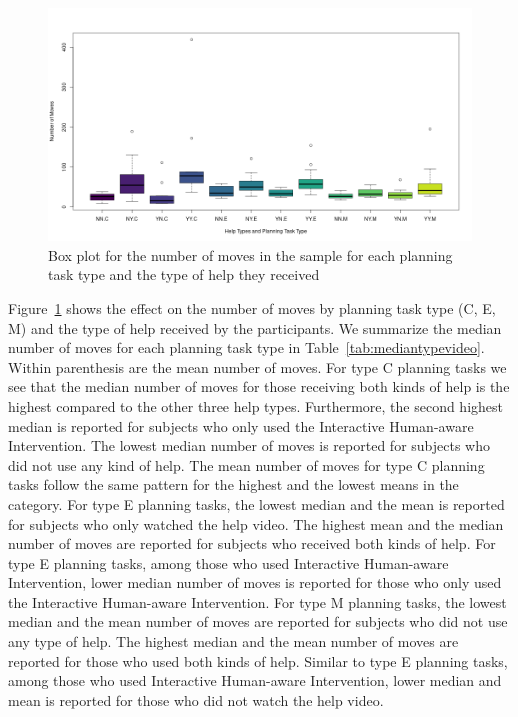 \begin{figure}[tpb]
  \centering
\includegraphics[width=\columnwidth]{img/helpsbytype.png}
  \caption{Box plot for the number of moves in the sample for each planning task type and the type of help they received}
  \label{fig:helpsbytype}
\end{figure}
Figure~\ref{fig:helpsbytype} shows the effect on the number of moves by planning task type (C, E, M) and the type of help received by the participants.
We summarize the median number of moves for each planning task type in Table~\ref{tab:mediantypevideo}.
Within parenthesis are the mean number of moves.
For type C planning tasks we see that the median number of moves for those receiving both kinds of help is the highest compared to the other three help types.
Furthermore, the second highest median is reported for subjects who only used the Interactive Human-aware Intervention.
The lowest median number of moves is reported for subjects who did not use any kind of help.
The mean number of moves for type C planning tasks follow the same pattern for the highest and the lowest means in the category.
For type E planning tasks, the lowest median and the mean is reported for subjects who only watched the help video.
The highest mean and the median number of moves are reported for subjects who received both kinds of help.
For type E planning tasks, among those who used Interactive Human-aware Intervention, lower median number of moves is reported for those who only used the Interactive Human-aware Intervention.
For type M planning tasks, the lowest median and the mean number of moves are reported for subjects who did not use any type of help.
The highest median and the mean number of moves are reported for those who used both kinds of help.
Similar to type E planning tasks, among those who used Interactive Human-aware Intervention, lower median and mean is reported for those who did not watch the help video.

